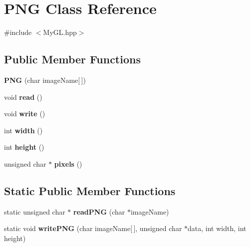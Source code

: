 \hypertarget{classPNG}{}\section{P\+N\+G Class Reference}
\label{classPNG}


{\ttfamily \#include $<$My\+G\+L.\+hpp$>$}

\subsection*{Public Member Functions}
\begin{DoxyCompactItemize}
\item 
\hypertarget{classPNG_a8239ef58cce7dfa23bf02a7620e985f5}{}{\bfseries P\+N\+G} (char image\+Name\mbox{[}$\,$\mbox{]})\label{classPNG_a8239ef58cce7dfa23bf02a7620e985f5}

\item 
\hypertarget{classPNG_a48b56be2d085e01f01b140528f999f5b}{}void {\bfseries read} ()\label{classPNG_a48b56be2d085e01f01b140528f999f5b}

\item 
\hypertarget{classPNG_a3e0b622c7ab188c3024295f8eebedd04}{}void {\bfseries write} ()\label{classPNG_a3e0b622c7ab188c3024295f8eebedd04}

\item 
\hypertarget{classPNG_a2b1a554b4f86d1b8ffa07c298782b14d}{}int {\bfseries width} ()\label{classPNG_a2b1a554b4f86d1b8ffa07c298782b14d}

\item 
\hypertarget{classPNG_ad6f6685a921c0f26352e22dc144fdda6}{}int {\bfseries height} ()\label{classPNG_ad6f6685a921c0f26352e22dc144fdda6}

\item 
\hypertarget{classPNG_a07898bac65710ae8aaeea6048dc773bc}{}unsigned char $\ast$ {\bfseries pixels} ()\label{classPNG_a07898bac65710ae8aaeea6048dc773bc}

\end{DoxyCompactItemize}
\subsection*{Static Public Member Functions}
\begin{DoxyCompactItemize}
\item 
\hypertarget{classPNG_a6df04a0372aa1054cc85a219829d882a}{}static unsigned char $\ast$ {\bfseries read\+P\+N\+G} (char $\ast$image\+Name)\label{classPNG_a6df04a0372aa1054cc85a219829d882a}

\item 
\hypertarget{classPNG_a12fe7f480b617e0cd58bd0ca7a65ed3a}{}static void {\bfseries write\+P\+N\+G} (char image\+Name\mbox{[}$\,$\mbox{]}, unsigned char $\ast$data, int width, int height)\label{classPNG_a12fe7f480b617e0cd58bd0ca7a65ed3a}

\end{DoxyCompactItemize}
